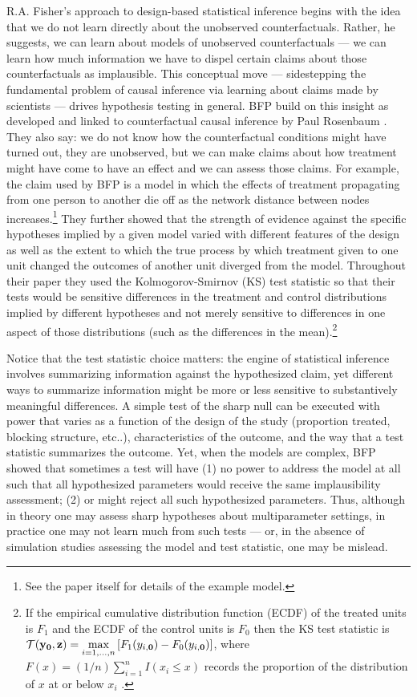 R.A. Fisher's approach to design-based statistical inference  \citep[Chap
2]{fisher:1935} begins with the idea that we do not learn directly about the
unobserved counterfactuals. Rather, he suggests, we can learn about models of
unobserved counterfactuals --- we can learn how much information we have to
dispel certain claims about those counterfactuals as implausible. This
conceptual move --- sidestepping the fundamental problem of causal inference
via learning about claims made by scientists --- drives hypothesis testing in
general.  BFP build on this insight as developed and
linked to counterfactual causal inference by Paul Rosenbaum
\citep{rosenbaum2010design}. They also say: we do not know how the
counterfactual conditions might have turned out, they are unobserved, but we
can make claims about how treatment might have come to have an effect and we
can assess those claims. For example, the claim used by
BFP is a model in which the effects of treatment
propagating from one person to another die off as the network distance between
nodes increases.\footnote{See the paper itself for details of the example
  model.} They further showed that the strength of evidence against the
specific hypotheses implied by a given model varied with different features of
the design as well as the extent to which the true process by which treatment
given to one unit changed the outcomes of another unit diverged from the
model. Throughout their paper they used the Kolmogorov-Smirnov (KS) test
statistic so that their tests would be sensitive differences in the treatment
and control distributions implied by different hypotheses and not merely
sensitive to differences in one aspect of those distributions (such as the
differences in the mean).\footnote{If the empirical cumulative distribution
  function (ECDF) of the treated units is $F_1$ and the ECDF of the control
  units is $F_0$ then the KS test statistic is $\mathcal{T}(\mathbf{y}_{\mathbf{0}},\mathbf{z}) = \underset{i =
    1,\ldots,n}{\text{max}}\left[F_1(y_{i,\mathbf{0}}) -
    F_0(y_{i,\mathbf{0}})\right]$, where $F(x)=(1/n)\sum_{i=1}^n I(x_i \le x)$
  records the proportion of the distribution of $x$ at or below $x_i$
  \citep[\S 5.4]{MylesHollander1999a}.}

Notice that the test statistic choice matters: the engine of statistical
inference involves summarizing information against the hypothesized claim, yet
different ways to summarize information might be more or less sensitive to
substantively meaningful differences. A simple test of the
sharp null can be executed with power that varies as a function of the design
of the study (proportion treated, blocking structure, etc..), characteristics
of the outcome, and the way that a test statistic summarizes the outcome. Yet,
when the models are complex,  BFP showed that sometimes a
test will have (1) no power to address the model at all such that all hypothesized parameters
would receive the same implausibility assessment; (2) or might reject all such
hypothesized parameters. Thus, although in theory one may assess sharp
hypotheses about multiparameter settings, in practice one may not learn much
from such tests --- or, in the absence of simulation studies assessing the
model and test statistic, one may be mislead.


